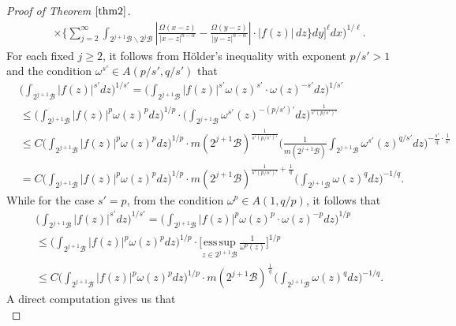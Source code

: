 \documentclass[preprint,10pt]{elsarticle}
\numberwithin{equation}{section}
\begin{document}
\begin{proof}[Proof of Theorem $\ref{thm2}$]
\begin{equation*}
\begin{split}
&\times\bigg\{\sum_{j=2}^\infty\int_{2^{j+1}\mathcal{B}\backslash 2^j\mathcal{B}}
\left|\frac{\Omega(x-z)}{|x-z|^{n-\alpha}}-\frac{\Omega(y-z)}{|y-z|^{n-\alpha}}\right|\cdot|f(z)|\,dz\bigg\}dy\bigg]^{\ell}dx\bigg)^{1/{\ell}}.
\end{split}
\end{equation*}
For each fixed $j\geq2$, it follows from H\"older's inequality with exponent $p/{s'}>1$ and the condition $\omega^{s'}\in A(p/{s'},q/{s'})$ that
\begin{equation*}
\begin{split}
&\bigg(\int_{2^{j+1}\mathcal{B}}|f(z)|^{s'}dz\bigg)^{1/{s'}}
=\bigg(\int_{2^{j+1}\mathcal{B}}|f(z)|^{s'}\omega(z)^{s'}\cdot \omega(z)^{-s'}dz\bigg)^{1/{s'}}\\
&\leq\bigg(\int_{2^{j+1}\mathcal{B}}|f(z)|^{p}\omega(z)^{p}dz\bigg)^{1/p}
\cdot\bigg(\int_{2^{j+1}\mathcal{B}}\omega^{s'}(z)^{-(p/{s'})'}dz\bigg)^{\frac{1}{s'(p/{s'})'}}\\
&\leq C\bigg(\int_{2^{j+1}\mathcal{B}}|f(z)|^{p}\omega(z)^{p}dz\bigg)^{1/p}\cdot m(2^{j+1}\mathcal{B})^{\frac{1}{s'(p/{s'})'}}
\bigg(\frac{1}{m(2^{j+1}\mathcal{B})}\int_{2^{j+1}\mathcal{B}}\omega^{s'}(z)^{{q}/{s'}}dz\bigg)^{-\frac{s'}{q}\cdot\frac{1}{s'}}\\
&= C\bigg(\int_{2^{j+1}\mathcal{B}}|f(z)|^{p}\omega(z)^{p}dz\bigg)^{1/p}
\cdot m(2^{j+1}\mathcal{B})^{\frac{1}{s'(p/{s'})'}+\frac{\,1\,}{q}}
\bigg(\int_{2^{j+1}\mathcal{B}}\omega(z)^{q}dz\bigg)^{-1/{q}}.
\end{split}
\end{equation*}
While for the case $s'=p$, from the condition $\omega^{p}\in A(1,q/{p})$, it follows that
\begin{equation*}
\begin{split}
&\bigg(\int_{2^{j+1}\mathcal{B}}|f(z)|^{s'}dz\bigg)^{1/{s'}}
=\bigg(\int_{2^{j+1}\mathcal{B}}|f(z)|^{p}\omega(z)^{p}\cdot \omega(z)^{-p}dz\bigg)^{1/{p}}\\
&\leq \bigg(\int_{2^{j+1}\mathcal{B}}|f(z)|^{p}\omega(z)^{p}dz\bigg)^{1/p}
\cdot\bigg[\underset{z\in 2^{j+1}\mathcal{B}}{\mathrm{ess\,sup}}\,\frac{1}{\omega^p(z)}\bigg]^{1/p}\\
&\leq C\bigg(\int_{2^{j+1}\mathcal{B}}|f(z)|^{p}\omega(z)^{p}dz\bigg)^{1/p}
\cdot m(2^{j+1}\mathcal{B})^{\frac{\,1\,}{q}}
\bigg(\int_{2^{j+1}\mathcal{B}}\omega(z)^{q}dz\bigg)^{-1/{q}}.
\end{split}
\end{equation*}
A direct computation gives us that
\begin{equation*}

\end{equation*}
\end{proof}
\end{document}
